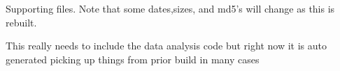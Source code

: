 \documentclass[aps,secnumarabic,balancelastpage,amsmath,amssymb,nofootinbib]{revtex4}
\makeatletter
\newcommand{\mjmversion}{\mjmrelease} %
\newcommand{\mjmtrno}{MJM-2023-007}
\newcommand{\mjmversion}{0.00} %
\newcommand{\mjmtrno}{MJM-2023-007}
\newcommand{\mjmtitle}{MJMDatascope : A viewer for streamed numerical data}
\newcommand{\mjmbasename}{\jobname}
\newcommand{\mjmversion}{ 0.00 }
\newcommand{\mjmtrno}{MJM-2023-007}
\newcommand{\mjmbibday}{14}
\newcommand{\mjmbibmo}{09}
\newcommand{\mjmbibyear}{2023}
\newcommand{\mjmemail}{marchywka@hotmail.com}
\newcommand{\mjmbasename}{\jobname}
\newcommand{\mjmbibday}{14}
\newcommand{\mjmbibmo}{09}
\newcommand{\mjmbibyear}{2023}
\newcommand{\mjmemail}{marchywka@hotmail.com}
\makeatother
\begin{document}
\begin{mdpicomment}
\begin{comment}
  AUTHOR =        \{M.J. Marchywka\},

  TITLE =         \{ \mjmtitle \},
 
  NUMBER =        \{\mjmtrno\},
  
  VERSION =        \{\mjmversion\},

  INSTITUTION =   \{  not institutionalized , independent\},

  ADDRESS =       \{306 Charles Cox , Canton GA 30115\},

  NOTE =          \{ May be recycled in appropriate media \},

  DATE  =          \{\today\},

  DAY  =          \{\mjmbibday\},

  MONTH =         \{\mjmbibmo\},

  YEAR  =         \{\mjmbibyear\},

  AUTHOR1EMAIL = \{\mjmemail\},

  AUTHOR1ID = \{orcid.org/0000-0001-9237-455X\},

  PAGES =         \{  \},

  CONTACT =       \{marchywka@hotmail.com\},

  FILENAME =       \{\mjmbasename\}

\}
\end{comment}
\vspace{1cm}
Supporting files. Note that some dates,sizes, and md5's will change as this is
rebuilt.

This really needs to include the data analysis code 
but right now it is auto generated picking up things from prior
build in many cases 

\end{mdpicomment}
\end{document}
